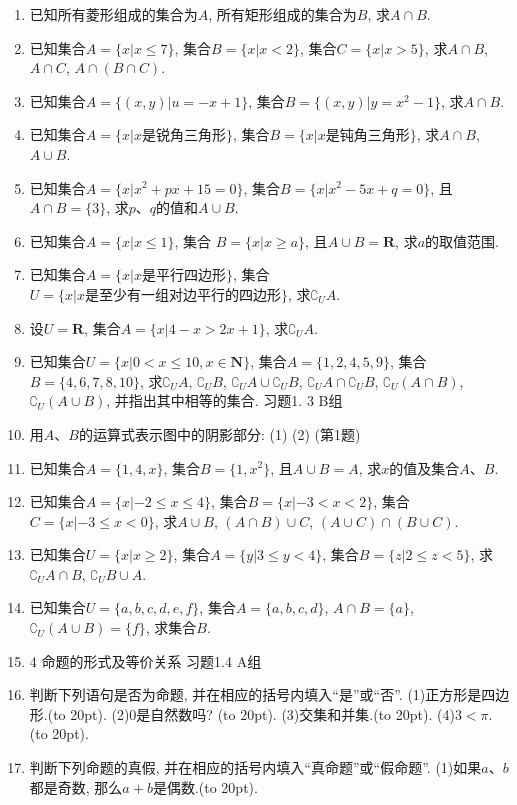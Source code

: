 \documentclass[10pt,a4paper]{article}
\newcommand{\bracket}[1]{(\hbox to #1pt{})}
\begin{document}
\begin{enumerate}[1.]
\item 已知所有菱形组成的集合为$A$, 所有矩形组成的集合为$B$, 求$A\cap B$.
\item 已知集合$A=\{x|x\le 7\}$, 集合$B=\{x|x<2\}$, 集合$C=\{x|x>5\}$, 求$A\cap B$, $A\cap C$, $A\cap (B\cap C)$.
\item 已知集合$A=\{(x,y)|u=-x+1\}$, 集合$B=\{(x,y)|y=x^2-1\}$, 求$A\cap B$.
\item 已知集合$A=\{x|x\text{是锐角三角形}\}$, 集合$B=\{x|x\text{是钝角三角形}\}$, 求$A\cap B$, $A\cup B$.
\item 已知集合$A=\{x|x^2+px+15=0\}$, 集合$B=\{x|x^2-5x+q=0\}$, 且$A\cap B=\{3\}$, 求$p$、$q$的值和$A\cup B$.
\item 已知集合$A=\{x|x\le 1\}$, 集合 $B=\{x|x\ge a\}$, 且$A\cup B=\mathbf{R}$, 求$a$的取值范围.
\item 已知集合$A=\{x|x\text{是平行四边形}\}$, 集合$U=\{x|x\text{是至少有一组对边平行的四边形}\}$, 求$\complement _UA$.
\item 设$U=\mathbf{R}$, 集合$A=\{x|4-x>2x+1\}$, 求$\complement _UA$.
\item 已知集合$U=\{x|0<x\le 10,x\in \mathbf{N}\}$, 集合$A=\{1,2,4,5,9\}$, 集合$B=\{4,6,7,8,10\}$, 求$\complement _UA$, $\complement _UB$, $\complement _UA\cup \complement _UB$, $\complement _UA\cap \complement _UB$, $\complement _U(A\cap B)$, $\complement _U(A\cup B)$, 并指出其中相等的集合.
习题1. 3  B组
\item 用$A$、$B$的运算式表示图中的阴影部分:
(1) (2)
(第1题)
\item 已知集合$A=\{1,4,x\}$, 集合$B=\{1,x^2\}$, 且$A\cup B=A$, 求$x$的值及集合$A$、$B$.
\item 已知集合$A=\{x|-2\le x\le 4\}$, 集合$B=\{x|-3<x<2\}$, 集合$C=\{x|-3\le x<0\}$, 求$A\cup B$, $(A\cap B)\cup C$, $(A\cup C)\cap (B\cup C)$.
\item 已知集合$U=\{x|x\ge 2\}$, 集合$A=\{y|3\le y<4\}$, 集合$B=\{z|2\le z<5\}$, 求$\complement _UA\cap B$, $\complement _UB\cup A$.
\item 已知集合$U=\{a,b,c,d,e,f\}$, 集合$A=\{a,b,c,d\}$, $A\cap B=\{a\}$, $\complement _U(A\cup B)=\{f\}$, 求集合$B$.
\item 4  命题的形式及等价关系
习题1.4  A组
\item 判断下列语句是否为命题, 并在相应的括号内填入``是''或``否''.
(1)正方形是四边形.\bracket{20}.
(2)0是自然数吗? \bracket{20}.
(3)交集和并集.\bracket{20}.
(4)$3<\pi$.\bracket{20}.
\item 判断下列命题的真假, 并在相应的括号内填入``真命题''或``假命题''.
(1)如果$a$、$b$都是奇数, 那么$a+b$是偶数.\bracket{20}.

\end{enumerate}
\end{document}
